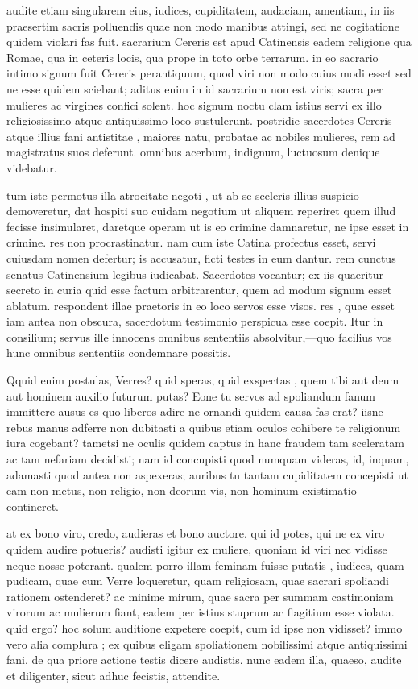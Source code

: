  audite etiam singularem eius, iudices, cupiditatem, audaciam, amentiam, in iis praesertim sacris polluendis quae non modo manibus attingi, sed ne cogitatione quidem violari fas fuit. sacrarium Cereris est apud Catinensis eadem religione qua Romae, qua in ceteris locis, qua prope in toto orbe terrarum. in eo sacrario intimo signum fuit Cereris perantiquum, quod viri non modo cuius modi esset sed ne esse quidem sciebant; aditus enim in id sacrarium non est viris; sacra per mulieres ac virgines confici solent. hoc signum noctu clam istius servi ex illo religiosissimo atque antiquissimo loco sustulerunt. postridie sacerdotes Cereris atque illius fani antistitae , maiores natu, probatae ac nobiles mulieres, rem ad magistratus suos deferunt. omnibus acerbum, indignum, luctuosum denique videbatur.

 tum iste permotus illa atrocitate negoti , ut ab se sceleris illius suspicio demoveretur, dat hospiti suo cuidam negotium ut aliquem reperiret quem illud fecisse insimularet, daretque operam ut is eo crimine damnaretur, ne ipse esset in crimine. res non procrastinatur. nam cum iste Catina profectus esset, servi cuiusdam nomen defertur; is accusatur, ficti testes in eum dantur. rem cunctus senatus Catinensium legibus iudicabat. Sacerdotes vocantur; ex iis quaeritur secreto in curia quid esse factum arbitrarentur, quem ad modum signum esset ablatum. respondent illae praetoris in eo loco servos esse visos. res , quae esset iam antea non obscura, sacerdotum testimonio perspicua esse coepit. Itur in consilium; servus ille innocens omnibus sententiis absolvitur,—quo facilius vos hunc omnibus sententiis condemnare possitis.

 Qquid enim postulas, Verres? quid speras, quid exspectas , quem tibi aut deum aut hominem auxilio futurum putas? Eone tu servos ad spoliandum fanum immittere ausus es quo liberos adire ne ornandi quidem causa fas erat? iisne rebus manus adferre non dubitasti a quibus etiam oculos cohibere te religionum iura cogebant? tametsi ne oculis quidem captus in hanc fraudem tam sceleratam ac tam nefariam decidisti; nam id concupisti quod numquam videras, id, inquam, adamasti quod antea non aspexeras; auribus tu tantam cupiditatem concepisti ut eam non metus, non religio, non deorum vis, non hominum existimatio contineret.

 at ex bono viro, credo, audieras et bono auctore. qui id potes, qui ne ex viro quidem audire potueris? audisti igitur ex muliere, quoniam id viri nec vidisse neque nosse poterant. qualem porro illam feminam fuisse putatis , iudices, quam pudicam, quae cum Verre loqueretur, quam religiosam, quae sacrari spoliandi rationem ostenderet? ac minime mirum, quae sacra per summam castimoniam virorum ac mulierum fiant, eadem per istius stuprum ac flagitium esse violata. quid ergo? hoc solum auditione expetere coepit, cum id ipse non vidisset? immo vero alia complura ; ex quibus eligam spoliationem nobilissimi atque antiquissimi fani, de qua priore actione testis dicere audistis. nunc eadem illa, quaeso, audite et diligenter, sicut adhuc fecistis, attendite.

